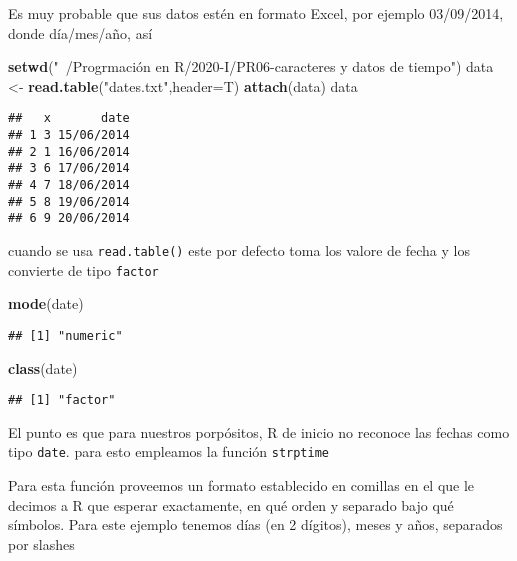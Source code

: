 \documentclass[]{article}
\newenvironment{Shaded}{\begin{snugshade}}{\end{snugshade}}
\newcommand{\KeywordTok}[1]{\textcolor[rgb]{0.13,0.29,0.53}{\textbf{#1}}}
\newcommand{\DataTypeTok}[1]{\textcolor[rgb]{0.13,0.29,0.53}{#1}}
\newcommand{\StringTok}[1]{\textcolor[rgb]{0.31,0.60,0.02}{#1}}
\newcommand{\NormalTok}[1]{#1}
\begin{document}
Es muy probable que sus datos estén en formato Excel, por ejemplo
03/09/2014, donde día/mes/año, así

\begin{Shaded}
\begin{Highlighting}[]
\KeywordTok{setwd}\NormalTok{(}\StringTok{"~/Progrmación en R/2020-I/PR06-caracteres y datos de tiempo"}\NormalTok{)}
\NormalTok{data <-}\StringTok{ }\KeywordTok{read.table}\NormalTok{(}\StringTok{"dates.txt"}\NormalTok{,}\DataTypeTok{header=}\NormalTok{T)}
\KeywordTok{attach}\NormalTok{(data)}
\NormalTok{data}
\end{Highlighting}
\end{Shaded}

\begin{verbatim}
##   x       date
## 1 3 15/06/2014
## 2 1 16/06/2014
## 3 6 17/06/2014
## 4 7 18/06/2014
## 5 8 19/06/2014
## 6 9 20/06/2014
\end{verbatim}

cuando se usa \texttt{read.table()} este por defecto toma los valore de
fecha y los convierte de tipo \texttt{factor}

\begin{Shaded}
\begin{Highlighting}[]
\KeywordTok{mode}\NormalTok{(date)}
\end{Highlighting}
\end{Shaded}

\begin{verbatim}
## [1] "numeric"
\end{verbatim}

\begin{Shaded}
\begin{Highlighting}[]
\KeywordTok{class}\NormalTok{(date)}
\end{Highlighting}
\end{Shaded}

\begin{verbatim}
## [1] "factor"
\end{verbatim}

El punto es que para nuestros porpósitos, R de inicio no reconoce las
fechas como tipo \texttt{date}. para esto empleamos la función
\texttt{strptime}

Para esta función proveemos un formato establecido en comillas en el que
le decimos a R que esperar exactamente, en qué orden y separado bajo qué
símbolos. Para este ejemplo tenemos días (en 2 dígitos), meses y años,
separados por slashes

\begin{Shaded}
\end{Shaded}
\end{document}
